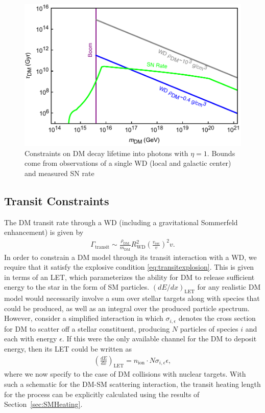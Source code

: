 \documentclass[twocolumn,showpacs,preprintnumbers,amsmath,amssymb,prd]{revtex4}
\def\r{\right)}
\def\l{\left(}
\begin{document}
\begin{figure}
\includegraphics[scale=.45]{decayobservation.pdf}
\caption{Constraints on DM decay lifetime into photons with $\eta =1$. Bounds come from observations of a single WD (local and galactic center) and measured SN rate}
\label{fig:decayclasses}
\end{figure}
 
\subsection{Transit Constraints}
\label{sec:TransitConstraints}

The DM transit rate through a WD (including a gravitational Sommerfeld enhancement) is given by
\begin{align}
\Gamma_\text{transit} \sim \frac{\rho_{\text{DM}}}{m_\text{DM}} R_\text{WD}^2 \l\frac{v_\text{esc}}{v}\r^2 v.
\label{eq:TransitFluxCondition}
\end{align}
In order to constrain a DM model through its transit interaction with a WD, we require that it satisfy the explosive condition \eqref{eq:transitexplosion}. 
This is given in terms of an LET, which parameterizes the ability for DM to release sufficient energy to the star in the form of SM particles.
$(dE/dx)_\text{LET}$ for any realistic DM model would necessarily involve a sum over stellar targets along with species that could be produced, as well as an integral over the produced particle spectrum.
However, consider a simplified interaction in which $\sigma_{i,\epsilon}$ denotes the cross section for DM to scatter off a stellar constituent, producing $N$ particles of species $i$ and each with energy $\epsilon$.
If this were the only available channel for the DM to deposit energy, then its LET could be written as
\begin{align}
\label{eq:schematicLET}
  \left( \frac{d E}{d x} \right)_\text{LET} = n_\text{ion} \cdot N \sigma_{i,\epsilon} \epsilon,
\end{align}
where we now specify to the case of DM collisions with nuclear targets. 
With such a schematic for the DM-SM scattering interaction, the transit heating length for the process can be explicitly calculated using the results of Section~\ref{sec:SMHeating}.
\end{document}
